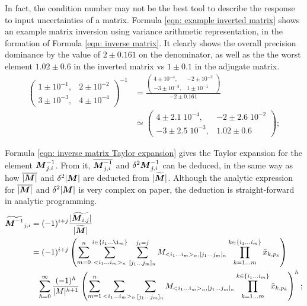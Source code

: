 \documentclass[twoside]{article}
\numberwithin{equation}{section}
\newcommand{\eqspace}{\;\;\;}
\begin{document}
In fact, the condition number may not be the best tool to describe the response to input uncertainties of a matrix.
Formula \eqref{eqn: example inverted matrix} shows an example matrix inversion using variance arithmetic representation, in the formation of Formula \eqref{eqn: inverse matrix}.
It clearly shows the overall precision dominance by the value of $2 \pm 0.161$ on the denominator, as well as the the worst element $1.02 \pm 0.6$ in the inverted matrix vs $1 \pm 0.1$ in the adjugate matrix.
\begin{align}
\label{eqn: example inverted matrix}
\left( \begin{matrix} 1 \pm 10^{-1}, & 2 \pm 10^{-2} \\ 3 \pm 10^{-3}, & 4 \pm 10^{-4} \end{matrix} \right)^{-1} &= 
\frac{ \left( \begin{matrix} 4 \pm 10^{-4}, & -2 \pm 10^{-2} \\ -3 \pm 10^{-3}, & 1 \pm 10^{-1} \end{matrix} \right) }{-2 \pm 0.161} \\
&\simeq \left( \begin{matrix} 4 \pm 2.1\;10^{-4}, & -2 \pm 2.6\;10^{-2} \\ -3 \pm 2.5\;10^{-3}, & 1.02 \pm 0.6 \end{matrix} \right); \nonumber
\end{align}

Formula \eqref{eqn: inverse matrix Taylor expansion} gives the Taylor expansion for the element $\protect{\textrm{\boldmath $M$}}^{-1}_{j,i}$.
From it, $\overline{\protect{\textrm{\boldmath $M$}}^{-1}_{j,i}}$ and $\delta^2 \protect{\textrm{\boldmath $M$}}^{-1}_{j,i}$ can be deduced, in the same way as how  $\overline{|\protect{\textrm{\boldmath $M$}}|}$ and $\delta^2 |\protect{\textrm{\boldmath $M$}}|$ are deducted from $|\widetilde{\protect{\textrm{\boldmath $M$}}}|$.
Although the analytic expression for $\overline{|\protect{\textrm{\boldmath $M$}}|}$ and $\delta^2 |\protect{\textrm{\boldmath $M$}}|$ is very complex on paper, the deduction is straight-forward in analytic programming.
\begin{align}
\label{eqn: inverse matrix Taylor expansion}
\widetilde{\M^{-1}}_{j,i} &= (-1)^{i+j} \frac{|\widetilde{\M_{i,j}}|}{|\widetilde{\M}|} \\
	&= (-1)^{i+j} \left( \sum_{m=0}^n \sum_{<i_1 \dots i_m>_n}^{i \in \{i_1 \dots \i_m\}} \sum_{[j_1 \dots j_{m}]_n}^{j_i =j} 
							M_{<i_1 \dots i_m>_n, [j_1 \dots j_{m}]_n} \prod_{k=1 \dots m}^{k \in \{i_1 \dots i_m\}} \tilde{x}_{k,p_{k}} \right) \nonumber \\
	&\eqspace \sum_{h=0}^{\infty} \frac{(-1)^h}{|M|^{h+1}}
				   \left( \sum_{m=1}^n \sum_{<i_1 \dots i_m>_n} \sum_{[j_1 \dots j_{m}]_n}
							M_{<i_1 \dots i_m>_n, [j_1 \dots j_{m}]_n} \prod_{k=1 \dots m}^{k \in \{i_1 \dots i_m\}} \tilde{x}_{k,p_{k}} \right)^h; \nonumber
\end{align}
\end{document}

